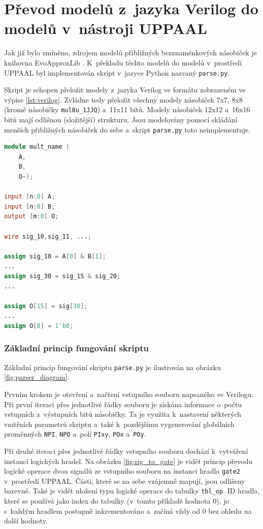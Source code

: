 \section{Převod modelů z~jazyka Verilog do modelů v~nástroji UPPAAL} \label{parser}
Jak již bylo zmíněno, zdrojem modelů přibližných bezznaménkových násobiček je knihovna EvoApproxLib \cite{circuit_library}. K~překladu těchto modelů do modelů v~prostředí UPPAAL byl implementován skript v~jazyce Python nazvaný \texttt{parse.py}.

Skript je schopen přeložit modely z~jazyka Verilog ve formátu zobrazeném ve výpise \ref{lst:verilog}. Zvládne tedy přeložit všechny modely násobiček 7x7, 8x8 (kromě násobičky \texttt{mul8u\_1JJQ}) a~11x11 bitů. Modely násobiček 12x12 a~16x16 bitů mají odlišnou (složitější) strukturu. Jsou modelovány pomocí skládání menších přibližných násobiček do sebe a~skript \texttt{parse.py} toto neimplementuje.

\begin{lstlisting}[language={Verilog}, caption={Příklad platného formátu modelu násobičky v~jazyce Verilog}, label={lst:verilog}]
module mult_name (
    A,
    B,
    O~);

input [n:0] A;
input [n:0] B;
output [m:0] O;

wire sig_10,sig_11, ...;

assign sig_10 = A[0] & B[1];
...
assign sig_30 = sig_15 & sig_20;
...

assign O[15] = sig[30];
...
assign O[0] = 1'b0;
\end{lstlisting}

\subsubsection{Základní princip fungování skriptu}
Základní princip fungování skriptu \texttt{parse.py} je ilustrován na obrázku \ref{fig:parser_diagram}.

Prvním krokem je otevření a~načtení vstupního souboru napsaného ve Verilogu. Při první iteraci přes jednotlivé řádky souboru je získána informace o~počtu vstupních a~výstupních bitů násobičky. Ta je využita k~nastavení některých vnitřních parametrů skriptu a~také k~pozdějšímu vygenerování globálních proměnných \texttt{NPI}, \texttt{NPO} a~polí \texttt{PIxy}, \texttt{POx} a~\texttt{POy}.

Při druhé iteraci přes jednotlivé řádky vstupního souboru dochází k~vytváření instancí logických hradel. Na obrázku \ref{fig:sig_to_gate} je vidět princip převodu logické operace dvou signálů ze vstupního souboru na instanci hradla \texttt{gate2} v~prostředí UPPAAL. Části, které se na sebe vzájemně mapují, jsou odlišeny barevně. Také je vidět uložení typu logické operace do tabulky \texttt{tbl\_op}. ID hradla, které se používá jako index do tabulky (v~tomto příkladě hodnota 0), je s~každým hradlem postupně inkrementováno a~začíná vždy od 0 bez ohledu na další hodnoty.


